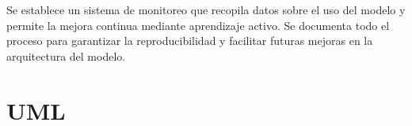 Se establece un sistema de monitoreo que recopila datos sobre el uso del modelo y permite la mejora continua mediante aprendizaje activo. Se documenta todo el proceso para garantizar la reproducibilidad y facilitar futuras mejoras en la arquitectura del modelo.

\section{UML}








